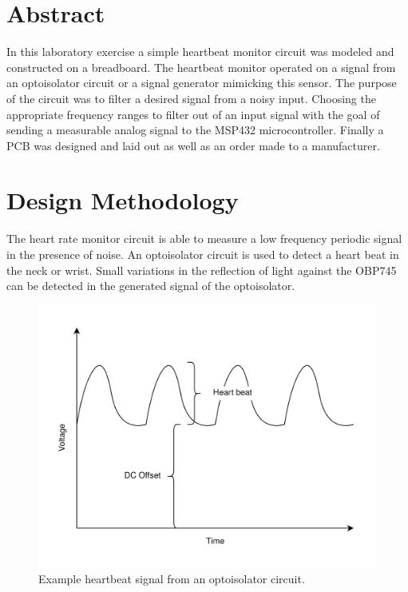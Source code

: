 \documentclass[CMPE]{../KGCOEReport}
\begin{document}
    \maketitle
    \section*{Abstract}

    In this laboratory exercise a simple heartbeat monitor circuit was modeled and
    constructed on a breadboard. The heartbeat monitor operated on a signal from
    an optoisolator circuit or a signal generator mimicking this sensor.
    The purpose of the circuit was to filter a desired
    signal from a noisy input. Choosing the appropriate frequency ranges to filter
    out of an input signal with the goal of sending a measurable analog signal to the
    MSP432 microcontroller. Finally a PCB was designed and laid out as well as an order
    made to a manufacturer.

    \section*{Design Methodology}

	The heart rate monitor circuit is able to measure a low frequency periodic signal
	in the presence of noise. An optoisolator circuit is used to detect a heart beat
	in the neck or wrist. Small variations in the reflection of light against the
	OBP745 can be detected in the generated signal of the optoisolator.

	\begin{figure}[h!]
        \centering
        \includegraphics[width=12cm]{heartbeat}
        \caption{Example heartbeat signal from an optoisolator circuit.}
        \label{fig:heartbeat}
	\end{figure}
\end{document}

